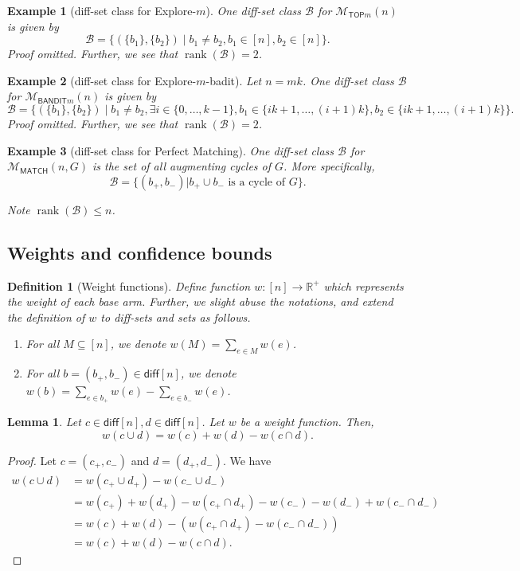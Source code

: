 \documentclass{article}
\newtheorem{define}{Definition}
\newtheorem{example}{Example}
\newtheorem{lemma}{Lemma}
\newcommand{\mmatch}{\mathcal M_{\mathsf{MATCH}}}
\newcommand{\mtop}{\mathcal M_{\mathsf{TOP}m}}
\newcommand{\mbandit}{\mathcal M_{\mathsf{BANDIT}m}}
\newcommand{\diff}{\mathsf{diff}}
\newcommand{\B}{\mathcal B}
\newcommand{\RR}{\mathbb R}
\DeclareMathOperator{\rank}{rank}
\begin{document}
\begin{spacing}{1.1}
\begin{example}[diff-set class for Explore-$m$]
One diff-set class $\B$ for $\mtop(n)$ is given by
$$
\B=\{(\{b_1\},\{b_2\}) \;|\; b_1\not=b_2, b_1\in[n], b_2\in[n]\}.
$$
Proof omitted.
Further, we see that $\rank(\B)=2$.
\end{example}

\begin{example}[diff-set class for Explore-$m$-badit]
Let $n=mk$.
One diff-set class $\B$ for $\mbandit(n)$ is given by
$$
\B=\{(\{b_1\},\{b_2\}) \;|\; b_1\not=b_2, \exists i\in\{0,\ldots,k-1\}, b_1\in \{ik+1,\ldots, (i+1)k\}, b_2\in\{ik+1,\ldots, (i+1)k\}\}.
$$
Proof omitted.
Further, we see that $\rank(\B)=2$.
\end{example}


\begin{example}[diff-set class for Perfect Matching]
One diff-set class $\B$ for $\mmatch(n, G)$ is the set of all augmenting cycles of $G$. 
More specifically,
$$
\B=\{(b_+,b_-) | b_+\cup b_- \text{ is a cycle of } G\}.
$$

Note $\rank(\B)\le n$.
\end{example}

\subsection{Weights and confidence bounds}

\begin{define}[Weight functions]
Define function $w: [n] \rightarrow \RR^+$ which represents the weight of each base arm. 
Further, we slight abuse the notations, and extend the definition of $w$ to diff-sets and sets as follows.
\begin{enumerate}
\item For all $M \subseteq [n]$, we denote $w(M) = \sum_{e\in M} w(e)$.
\item For all $b=(b_+,b_-) \in \diff[n]$, we denote $w(b) = \sum_{e\in b_+} w(e)-\sum_{e\in b_-}w(e)$.
\end{enumerate}
\end{define}


\begin{lemma}
Let $c\in \diff[n],d\in \diff[n]$. Let $w$ be a weight function.
Then,
\begin{equation}
w(c\cup d) = w(c)+w(d)-w(c\cap d).
\end{equation}
\end{lemma}

\begin{proof}
Let $c=(c_+,c_-)$ and $d=(d_+,d_-)$.
We have
\begin{align}
w(c\cup d) &= w(c_+\cup d_+)-w(c_-\cup d_-)\\
           &= w(c_+)+w(d_+)-w(c_+\cap d_+)-w(c_-)-w(d_-)+w(c_- \cap d_-)\\
           &= w(c)+w(d)-(w(c_+\cap d_+)-w(c_-\cap d_-))\\
           &= w(c)+w(d)-w(c\cap d).
\end{align}
\end{proof}


\end{spacing}
\end{document}

